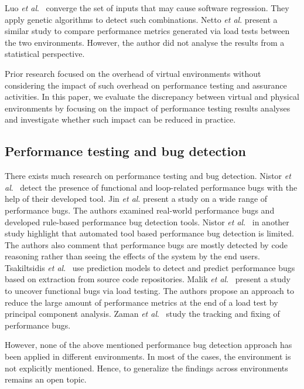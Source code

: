 \documentclass[smallextended]{svjour3}       %
\begin{document}
Luo \textit{et al$.$}~\cite{Luo:2016:MPR:2901739.2901765} converge the set of inputs that may cause software regression. They apply genetic algorithms to detect such combinations. Netto \textit{et al$.$} \cite{netto2011evaluating} present a similar study to compare performance metrics generated via load tests between the two environments. However, the author did not analyse the results from a statistical perspective.

Prior research focused on the overhead of virtual environments without considering the impact of such overhead on performance testing and assurance activities. In this paper, we evaluate the discrepancy between virtual and physical environments by focusing on the impact of performance testing results analyses and investigate whether such impact can be reduced in practice.


\subsection{Performance testing and bug detection}

There exists much research on performance testing and bug detection. Nistor \textit{et al$.$}~\cite{Nistor} detect the presence of functional and loop-related performance bugs with the help of their developed tool. Jin \textit{et al$.$} \cite{Jin} present a study on a wide range of performance bugs. The authors examined real-world performance bugs and developed rule-based performance bug detection tools. Nistor \textit{et al$.$}~\cite{nistor_2} in another study highlight that automated tool based performance bug detection is limited. The authors also comment that performance bugs are mostly detected by code reasoning rather than seeing the effects of the system by the end users. Tsakiltsidis \textit{et al$.$}~\cite{Tsakiltsidis} use prediction models to detect and predict performance bugs based on extraction from source code repositories. Malik \textit{et al$.$}~\cite{h_malik_p_bugs} present a study to uncover functional bugs via load testing. The authors propose an approach to reduce the large amount of performance metrics at the end of a load test by principal component analysis. Zaman \textit{et al$.$}~\cite{zaman_p_bugs} study the tracking and fixing of performance bugs.

However, none of the above mentioned performance bug detection approach has been applied in different environments. In most of the cases, the environment is not explicitly mentioned. Hence, to generalize the findings across environments remains an open topic.
\end{document}
